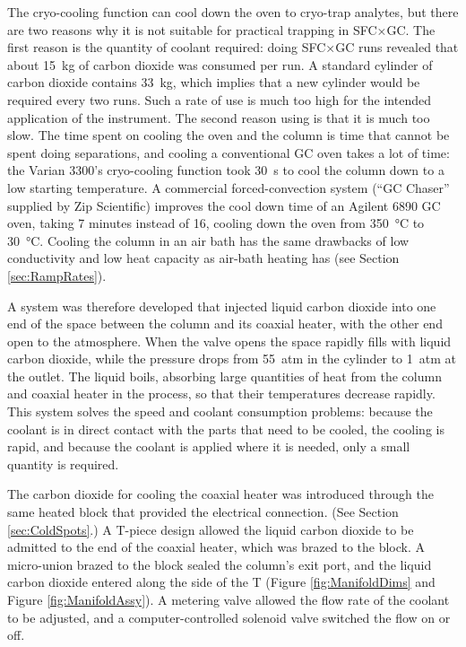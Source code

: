 The cryo-cooling function can cool down the oven to cryo-trap analytes, but
there are two reasons why it is not suitable for practical trapping in SFC×GC.
The first reason is the quantity of coolant required: doing SFC×GC runs revealed
that about \SI{15}{\kilogram} of carbon dioxide was consumed per run. A standard
cylinder of carbon dioxide contains \SI{33}{\kilogram}, which implies that a new
cylinder would be required every two runs. Such a rate of use is much too high
for the intended application of the instrument. The second reason using is that
it is much too slow. The time spent on cooling the oven and the column is time
that cannot be spent doing separations, and cooling a conventional GC oven takes
a lot of time: the Varian 3300's cryo-cooling function took \SI{30}{\second} to
cool the column down to a low starting temperature. A commercial
forced-convection system (``GC Chaser'' supplied by Zip Scientific) improves the
cool down time of an Agilent 6890 GC oven, taking 7 minutes instead of 16,
cooling down the oven from \SI{350}{\celsius} to \SI{30}{\celsius}.
Cooling the column in an air bath has the same drawbacks of low conductivity and
low heat capacity as air-bath heating has (see Section \ref{sec:RampRates}).

A system was therefore developed that injected liquid carbon dioxide into one
end of the space between the column and its coaxial heater, with the other end
open to the atmosphere. When the valve opens the space rapidly fills with liquid
carbon dioxide, while the pressure drops from \SI{55}{atm} in the cylinder to
\SI{1}{atm} at the outlet. The liquid boils, absorbing large quantities of heat
from the column and coaxial heater in the process, so that their temperatures
decrease rapidly. This system solves the speed and coolant consumption problems:
because the coolant is in direct contact with the parts that need to be cooled,
the cooling is rapid, and because the coolant is applied where it is needed,
only a small quantity is required.

The carbon dioxide for cooling the coaxial heater was introduced through the
same heated block that provided the electrical connection. (See Section
\ref{sec:ColdSpots}.) A T-piece design allowed the liquid carbon dioxide to be
admitted to the end of the coaxial heater, which was brazed to the block. A
micro-union brazed to the block sealed the column's exit port, and the liquid
carbon dioxide entered along the side of the T (Figure \ref{fig:ManifoldDims}
and Figure \ref{fig:ManifoldAssy}). A metering valve allowed the flow rate of
the coolant to be adjusted, and a computer-controlled solenoid valve switched
the flow on or off.

